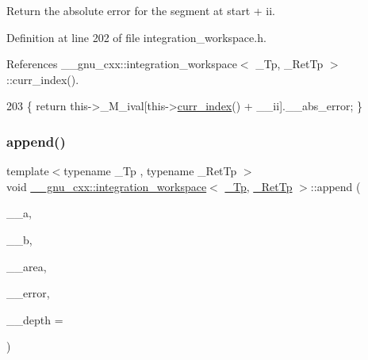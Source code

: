 Return the absolute error for the segment at start + ii. 

Definition at line 202 of file integration\+\_\+workspace.\+h.



References \+\_\+\+\_\+gnu\+\_\+cxx\+::integration\+\_\+workspace$<$ \+\_\+\+Tp, \+\_\+\+Ret\+Tp $>$\+::curr\+\_\+index().


\begin{DoxyCode}
203       \{ \textcolor{keywordflow}{return} this->\_M\_ival[this->\hyperlink{class____gnu__cxx_1_1integration__workspace_a51a384b1777615943add69f1895454f5}{curr\_index}() + \_\_ii].\_\_abs\_error; \}
\end{DoxyCode}
\mbox{\label{class____gnu__cxx_1_1integration__workspace_ac0faf5a81b8a6ac1519a9f2dd29d83e5}} 
\subsubsection{\texorpdfstring{append()}{append()}}
{\footnotesize\ttfamily template$<$typename \+\_\+\+Tp , typename \+\_\+\+Ret\+Tp $>$ \\
void \hyperlink{class____gnu__cxx_1_1integration__workspace}{\+\_\+\+\_\+gnu\+\_\+cxx\+::integration\+\_\+workspace}$<$ \hyperlink{namespace____gnu__cxx_a3b19a9c800ca194374ef9172290f7d79}{\+\_\+\+Tp}, \hyperlink{namespace____gnu__cxx_a886e03ece3d53ff7fa6c098a40f93fa5}{\+\_\+\+Ret\+Tp} $>$\+::append (\begin{DoxyParamCaption}\item[{\hyperlink{namespace____gnu__cxx_a3b19a9c800ca194374ef9172290f7d79}{\+\_\+\+Tp}}]{\+\_\+\+\_\+a,  }\item[{\hyperlink{namespace____gnu__cxx_a3b19a9c800ca194374ef9172290f7d79}{\+\_\+\+Tp}}]{\+\_\+\+\_\+b,  }\item[{\+\_\+\+Area\+Tp}]{\+\_\+\+\_\+area,  }\item[{\+\_\+\+Error\+Tp}]{\+\_\+\+\_\+error,  }\item[{std\+::size\+\_\+t}]{\+\_\+\+\_\+depth = {} }\end{DoxyParamCaption})}



